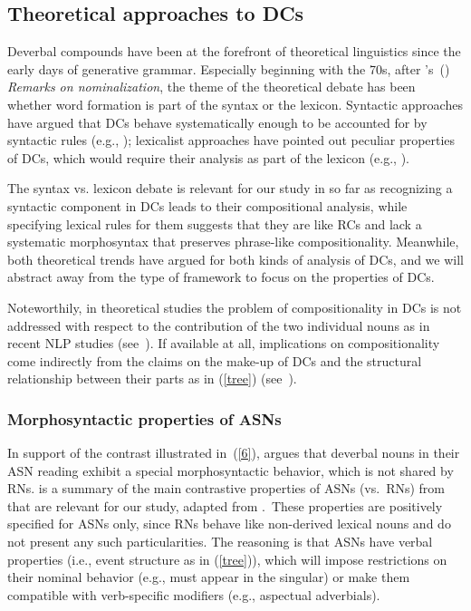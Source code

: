 \documentclass[output=paper]{langsci/langscibook}
\begin{document}
\subsection{Theoretical approaches to DCs}\label{sec:theoretical:lit}
Deverbal compounds have been at the forefront of theoretical linguistics since the early days of generative grammar. Especially beginning with the 70s, after \citeauthor{chomsky:70}'s~(\citeyear{chomsky:70}) \textit{Remarks on nominalization}, the theme of the theoretical debate has been whether word formation is part of the syntax or the lexicon. Syntactic approaches have argued that DCs behave systematically enough to be accounted for by syntactic rules (e.g., \cite{roeper:siegel:78,ackema:neeleman:04}); lexicalist approaches have pointed out peculiar properties of DCs, which would require their analysis as part of the lexicon (e.g., \cite{selkirk:82,lieber:04}). 

The syntax vs. lexicon debate is relevant for our study in so far as recognizing a syntactic component in DCs leads to their compositional analysis, while specifying lexical rules for them suggests that they are like RCs and lack a systematic morphosyntax that preserves phrase-like compositionality. Meanwhile, both theoretical trends have argued for both kinds of analysis of DCs, and we will abstract away from the type of framework to focus on the properties of DCs.


Noteworthily, in theoretical studies the problem of compositionality in DCs is not addressed with respect to the contribution of the two individual nouns as in recent NLP studies (see~). If available at all, implications on compositionality come indirectly from the claims on the  make-up of DCs and the structural relationship between their  parts as in (\ref{tree}) (see~).

\subsubsection{Morphosyntactic properties of ASNs}\label{sec:properties:ASN}
 In support of the contrast illustrated in~(\ref{6}), \cite{grimshaw:90}  argues that  deverbal nouns in their ASN reading exhibit a special morphosyntactic behavior, which is not shared by RNs.
 is a summary of the main contrastive properties of ASNs (vs.~RNs) from \cite{grimshaw:90} that are relevant for our study, adapted from \citet[3]{alexiadou:grimshaw:08}.\  These properties are positively specified for ASNs only, since RNs behave like non-derived lexical nouns and do not present any such particularities. The reasoning is that ASNs have  verbal properties (i.e., event structure as in (\ref{tree})), which will impose restrictions on their nominal behavior (e.g., must  appear in the singular) or make them compatible with verb-specific modifiers (e.g., aspectual adverbials).
\end{document}
